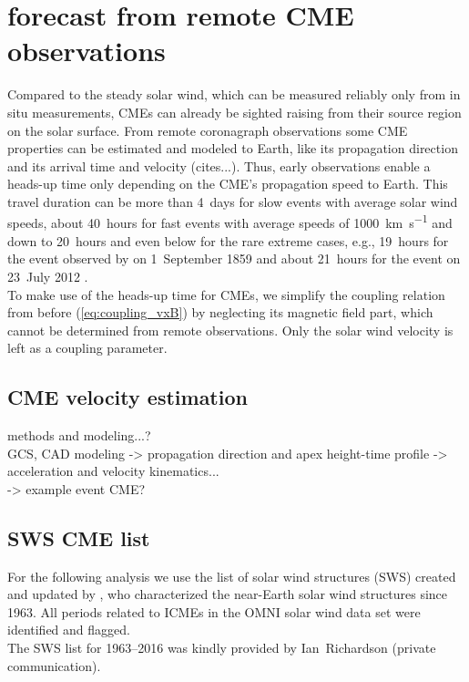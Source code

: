 \section{\Kp{} forecast from remote CME observations}
Compared to the steady solar wind, which can be measured reliably only from in situ measurements, CMEs can already be sighted raising from their source region on the solar surface. From remote coronagraph observations some CME properties can be estimated and modeled to Earth, like its propagation direction and its arrival time and velocity (cites...). Thus, early observations enable a heads-up time only depending on the CME's propagation speed to Earth. This travel duration can be more than 4~days for slow events with average solar wind speeds, about 40~hours for fast events with average speeds of \SI{1000}{\km\per\s} and down to 20~hours and even below for the rare extreme cases, e.g., 19~hours for the event observed by \citet{Carrington1859} on 1~September 1859 and about 21~hours for the event on 23~July 2012 \citep{Russell2013,Temmer2015}.\\

To make use of the heads-up time for CMEs, we simplify the coupling relation from before (\ref{eq:coupling_vxB}) by neglecting its magnetic field part, which cannot be determined from remote observations. Only the solar wind velocity is left as a coupling parameter.\\

\subsection{CME velocity estimation}
methods and modeling...?\\
GCS, CAD modeling -> propagation direction and apex height-time profile -> acceleration and velocity kinematics...\\
-> example event CME?\\

\subsection{SWS CME list}
For the following analysis we use the list of solar wind structures (SWS) created and updated by \citet{Richardson2000,Richardson2012}, who characterized the near-Earth solar wind structures since 1963. All periods related to ICMEs in the OMNI solar wind data set were identified and flagged.\\

The SWS list for 1963--2016 was kindly provided by Ian~Richardson (private communication).\\

